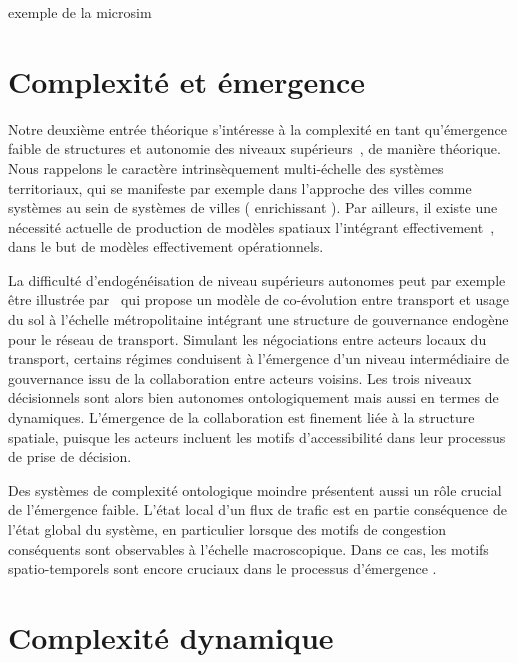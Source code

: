 \documentclass[11pt]{article}
\begin{document}
exemple de la microsim \cite{birkin2011spatial}



\section{Complexité et émergence}



Notre deuxième entrée théorique s'intéresse à la complexité en tant qu'émergence faible de structures et autonomie des niveaux supérieurs~\citep{bedau2002downward}, de manière théorique. Nous rappelons le caractère intrinsèquement multi-échelle des systèmes territoriaux, qui se manifeste par exemple dans l'approche des villes comme systèmes au sein de systèmes de villes (\cite{pumain1997pour} enrichissant \cite{berry1964cities}). Par ailleurs, il existe une nécessité actuelle de production de modèles spatiaux l'intégrant effectivement~\citep{rozenblat2018conclusion}, dans le but de modèles effectivement opérationnels.

La difficulté d'endogénéisation de niveau supérieurs autonomes peut par exemple être illustrée par~\cite{lenechet:halshs-01272236} qui propose un modèle de co-évolution entre transport et usage du sol à l'échelle métropolitaine intégrant une structure de gouvernance endogène pour le réseau de transport. Simulant les négociations entre acteurs locaux du transport, certains régimes conduisent à l'émergence d'un niveau intermédiaire de gouvernance issu de la collaboration entre acteurs voisins. Les trois niveaux décisionnels sont alors bien autonomes ontologiquement mais aussi en termes de dynamiques. L'émergence de la collaboration est finement liée à la structure spatiale, puisque les acteurs incluent les motifs d'accessibilité dans leur processus de prise de décision.

Des systèmes de complexité ontologique moindre présentent aussi un rôle crucial de l'émergence faible. L'état local d'un flux de trafic est en partie conséquence de l'état global du système, en particulier lorsque des motifs de congestion conséquents sont observables à l'échelle macroscopique. Dans ce cas, les motifs spatio-temporels sont encore cruciaux dans le processus d'émergence \citep{treiber2010three}.






\section{Complexité dynamique}
\end{document}
